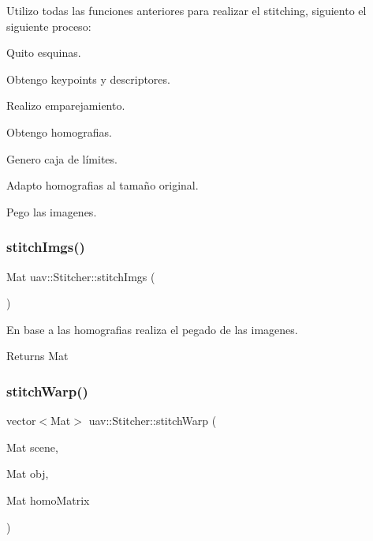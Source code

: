 Utilizo todas las funciones anteriores para realizar el stitching, siguiento el siguiente proceso\+: 


\begin{DoxyItemize}
\item Quito esquinas.
\item Obtengo keypoints y descriptores.
\item Realizo emparejamiento.
\item Obtengo homografias.
\item Genero caja de límites.
\item Adapto homografias al tamaño original.
\item Pego las imagenes. 
\end{DoxyItemize}\mbox{\label{classuav_1_1Stitcher_a650ea572d679be3b9ca07e142508a324}} 
\subsubsection{\texorpdfstring{stitch\+Imgs()}{stitchImgs()}}
{\footnotesize\ttfamily Mat uav\+::\+Stitcher\+::stitch\+Imgs (\begin{DoxyParamCaption}{ }\end{DoxyParamCaption})\hspace{0.3cm}{\ttfamily [inline]}}



En base a las homografias realiza el pegado de las imagenes. 

\begin{DoxyReturn}{Returns}
Mat 
\end{DoxyReturn}
\mbox{\label{classuav_1_1Stitcher_a096e8020a5544325400743836c8ba58d}} 
\subsubsection{\texorpdfstring{stitch\+Warp()}{stitchWarp()}}
{\footnotesize\ttfamily vector$<$Mat$>$ uav\+::\+Stitcher\+::stitch\+Warp (\begin{DoxyParamCaption}\item[{Mat}]{scene,  }\item[{Mat}]{obj,  }\item[{Mat}]{homo\+Matrix }\end{DoxyParamCaption})\hspace{0.3cm}{\ttfamily [inline]}}



